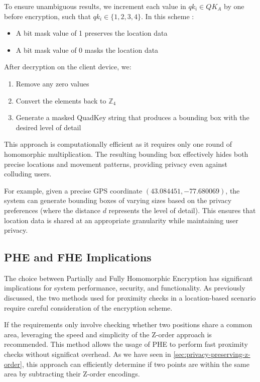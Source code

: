 To ensure unambiguous results, we increment each value in \( qk_i \in QK_A \) by one before encryption, such that \( qk_i \in \{1,2,3,4\} \). In this scheme \cite{zhang2020privacy}:
\begin{itemize}
    \item A bit mask value of 1 preserves the location data
    \item A bit mask value of 0 masks the location data
\end{itemize}

After decryption on the client device, we:
\begin{enumerate}
    \item Remove any zero values
    \item Convert the elements back to \( \mathbb{Z}_4 \)
    \item Generate a masked QuadKey string that produces a bounding box with the desired level of detail
\end{enumerate}

This approach is computationally efficient as it requires only one round of homomorphic multiplication. The resulting bounding box effectively hides both precise locations and movement patterns, providing privacy even against colluding users.

For example, given a precise GPS coordinate \( (43.084451, -77.680069) \), the system can generate bounding boxes of varying sizes based on the privacy preferences (where the distance \( d \) represents the level of detail). This ensures that location data is shared at an appropriate granularity while maintaining user privacy.


\subsection{PHE and FHE Implications}

The choice between Partially and Fully Homomorphic Encryption has significant implications for system performance, security, and functionality. As previously discussed, the two methods used for proximity checks in a location-based scenario require careful consideration of the encryption scheme.

If the requirements only involve checking whether two positions share a common area, leveraging the speed and simplicity of the Z-order approach is recommended. This method allows the usage of PHE to perform fast proximity checks without significat overhead. As we have seen in \cref{sec:privacy-preserving-z-order}, this approach can efficiently determine if two points are within the same area by subtracting their Z-order encodings.

